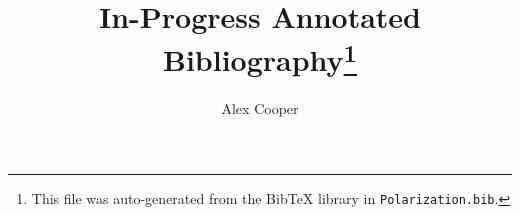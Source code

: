 \documentclass[a4paper,10pt]{article}
\title{In-Progress Annotated Bibliography\thanks{
This file was auto-generated from the BibTeX library in {\tt Polarization.bib}.
}}
\author{Alex Cooper}
\begin{document}
\maketitle
\nocite{*}



\end{document}
